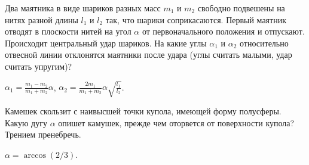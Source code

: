 \begin{ex} %
Два маятника в виде шариков разных масс $m_1$ и $m_2$ свободно подвешены на нитях разной длины $l_1$ и $l_2$ так, что шарики соприкасаются. Первый маятник отводят в плоскости нитей на угол $\alpha$ от первоначального положения и отпускают. Происходит центральный удар шариков. На какие углы $\alpha_1$ и $\alpha_2$ относительно отвесной линии отклонятся маятники после удара (углы считать малыми, удар считать упругим)?
\begin{ans}
$\alpha_1 =\frac{m_1-m_2}{m_1+m_2}\alpha$, $\alpha_2 =\frac{2m_1}{m_1+m_2}\alpha \sqrt{\frac{l_1}{l_2}}$.
\end{ans}
\end{ex}

\begin{ex} %
Камешек скользит с наивысшей точки купола, имеющей форму полусферы. Какую дугу $\alpha$ опишет камушек, прежде чем оторвется от поверхности купола? Трением пренебречь.
\begin{ans}
$\alpha = \arccos(2/3)$.
\end{ans}
\end{ex}

\clearpage